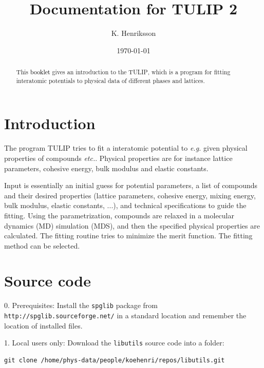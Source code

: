 \documentclass[a4paper,12pt,pdftex,onecolumn]{article}
\newcommand{\eg}{\emph{e.g.}\xspace}
\newcommand{\etc}{\emph{etc.}\xspace}
\begin{document}
\title{
Documentation for \textsc{TULIP} 2
}
\author{K. Henriksson}
\date{\today}

\maketitle

\begin{abstract}
This \textcolor{black}{booklet} gives an introduction to the \textsc{TULIP}, which is
a program for fitting interatomic potentials to physical data
of different phases and lattices.
\end{abstract}

\tableofcontents






\section{Introduction}

The program \textsc{TULIP} tries to fit a interatomic potential
to \eg given physical properties of compounds \etc. Physical properties are
for instance lattice parameters, cohesive energy, bulk modulus and
elastic constants.

Input is essentially an initial guess for potential parameters,
a list of compounds and their desired properties
(lattice parameters, cohesive energy, mixing energy, bulk modulus,
elastic constants, ...), and technical specifications to guide the fitting.
Using the parametrization, compounds are relaxed in a molecular
dynamics (MD) simulation (MDS), and then the specified physical properties
are calculated.
The fitting routine tries to minimize the merit function. The fitting method
can be selected.




\section{Source code}

0. Prerequisites: Install the \verb+spglib+ package from
\verb+http://spglib.sourceforge.net/+ in a standard location and
remember the location of installed files.

1. Local users only: Download the \verb+libutils+ source code into a folder:

\begin{Verbatim}[fontsize=\relsize{-1},frame=single]
git clone /home/phys-data/people/koehenri/repos/libutils.git
\end{Verbatim}
\end{document}
